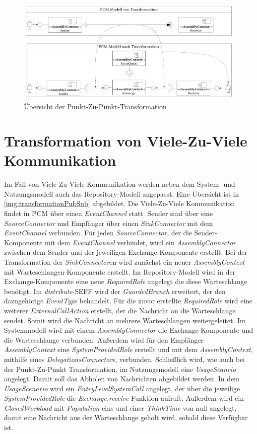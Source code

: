 \begin{figure}
\center
  \includegraphics[width=1.3\textwidth, angle=90]{images/transformation/transformationSystemP2P.pdf}
  \caption{Übersicht der Punkt-Zu-Punkt-Transformation}
  \label{img:transformationP2P}
\end{figure}

\section{Transformation von Viele-Zu-Viele Kommunikation}
Im Fall von Viele-Zu-Viele Kommunikation werden neben dem System- und Nutzungsmodell auch das Repository-Modell angepasst. Eine Übersicht ist in \autoref{img:transformationPubSub} abgebildet. Die Viele-Zu-Viele Kommunikation findet in PCM über einen \emph{EventChannel} statt. Sender sind über eine \emph{SourceConnector} und Empfänger über einen \emph{SinkConnector} mit dem \emph{EventChannel} verbunden. Für jeden \emph{SourceConnector}, der die Sender-Komponente mit dem \emph{EventChannel} verbindet, wird ein \emph{AssemblyConnector} zwischen dem Sender und der jeweiligen Exchange-Komponente erstellt. Bei der Transformation der \emph{SinkConnector}en wird zunächst ein neuer \emph{AssemblyContext} mit Warteschlangen-Komponente erstellt. Im Repository-Modell wird in der Exchange-Komponente eine neue \emph{RequiredRole} angelegt die diese Warteschlange benötigt. Im \emph{distribute}-SEFF wird der \emph{GuardedBranch} erweitert, der den dazugehörige \emph{EventType} behandelt. Für die zuvor erstellte \emph{RequiredRole} wird eine weiterer \emph{ExternalCallAction} erstellt, der die Nachricht an die Warteschlange sendet. Somit wird die Nachricht an mehrere Warteschlangen weitergeleitet. Im Systemmodell wird mit einem \emph{AssemblyConnector} die Exchange-Komponente und die Warteschlange verbunden. Außerdem wird für den Empfänger-\emph{AssemblyContext} eine \emph{SystemProvidedRole} erstellt und mit dem \emph{AssemblyContext}, mithilfe eines \emph{DelegationsConnector}s, verbunden. Schließlich wird, wie auch bei der Punkt-Zu-Punkt Transformation, im Nutzungsmodell eine \emph{UsageScanrio} angelegt. Damit soll das Abholen von Nachrichten abgebildet werden. In dem \emph{UsageScenario} wird ein \emph{EntryLevelSystemCall} angelegt, der über die jeweilige \emph{SystemProvidedRole} die \emph{Exchange.receive} Funktion aufruft. Außerdem wird ein \emph{ClosedWorkload} mit \emph{Population} eins und einer \emph{ThinkTime} von null angelegt, damit eine Nachricht aus der Warteschlange geholt wird, sobald diese Verfügbar ist.

